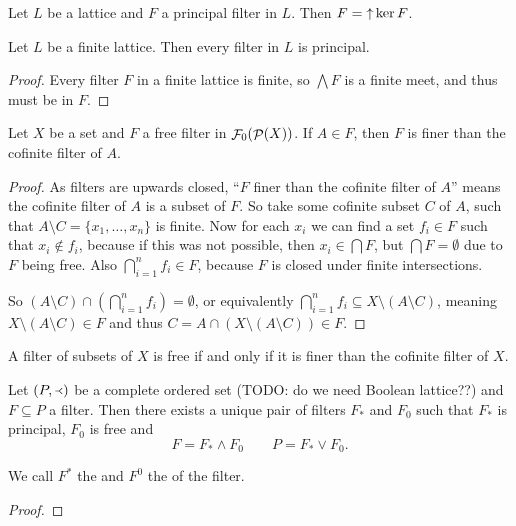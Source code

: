 \begin{lemma}
Let $L$ be a lattice and $F$ a principal filter in $L$. Then $F = \mathop{\uparrow} \ker F$.
\end{lemma}

\begin{lemma} \label{finiteFiltersPrincipal}
Let $L$ be a finite lattice. Then every filter in $L$ is principal.
\end{lemma}
\begin{proof}
Every filter $F$ in a finite lattice is finite, so $\bigwedge F$ is a finite meet, and thus must be in $F$.
\end{proof}

\begin{proposition}
Let $X$ be a set and $F$ a free filter in $\mathop{\mathcal{F}}_0(\mathop{\mathcal{P}}(X))$. If $A\in F$, then $F$ is finer than the cofinite filter of $A$.
\end{proposition}
\begin{proof}
As filters are upwards closed, ``$F$ finer than the cofinite filter of $A$'' means the cofinite filter of $A$ is a subset of $F$. So take some cofinite subset $C$ of $A$, such that $A\setminus C = \{x_1, \ldots, x_n\}$ is finite. Now for each $x_i$ we can find a set $f_i\in F$ such that $x_i\notin f_i$, because if this was not possible, then $x_i \in \bigcap F$, but $\bigcap F = \emptyset$ due to $F$ being free. Also $\bigcap_{i=1}^n f_i \in F$, because $F$ is closed under finite intersections.

So $(A\setminus C)\cap (\bigcap_{i=1}^n f_i) = \emptyset$, or equivalently $\bigcap_{i=1}^n f_i \subseteq X\setminus (A\setminus C)$, meaning $X\setminus (A\setminus C) \in F$ and thus $C = A\cap (X\setminus (A\setminus C)) \in F$.
\end{proof}
\begin{corollary}
A filter of subsets of $X$ is free \textup{if and only if} it is finer than the cofinite filter of $X$.
\end{corollary}

\begin{proposition}
Let $\left( P,\Yleft \right)$ be a complete ordered set (TODO: do we need Boolean lattice??) and $F\subseteq P$ a filter. Then there exists a unique pair of filters $F_*$ and $F_0$ such that $F_*$ is principal, $F_0$ is free and
\[ F = F_* \wedge F_0 \qquad P = F_* \vee F_0. \]
\end{proposition}
We call $F^*$ the  and $F^0$ the  of the filter.
\begin{proof}

\end{proof}

